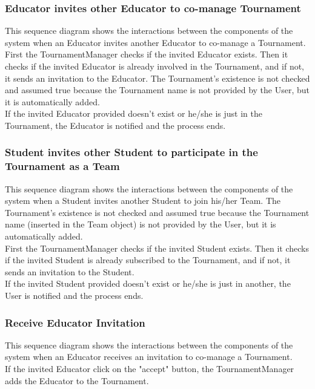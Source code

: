 \begin{landscape}
\clearpage
\subsubsection{Educator invites other Educator to co-manage Tournament}
This sequence diagram shows the interactions between the components of the system when an Educator invites another Educator to co-manage a Tournament.\\
First the TournamentManager checks if the invited Educator exists. Then it checks if the invited Educator is already involved in the Tournament, and if not, it sends an invitation to the Educator. The Tournament's existence is not
checked and assumed true because the Tournament name is not provided by the User, but it is automatically added.\\
If the invited Educator provided doesn't exist or he/she is just in the Tournament, the Educator is notified and the process ends.\\

\clearpage
\subsubsection{Student invites other Student to participate in the Tournament as a Team}
This sequence diagram shows the interactions between the components of the system when a Student invites another Student to join his/her Team. The Tournament's existence is not checked and assumed true because the Tournament name (inserted
in the Team object) is not provided by the User, but it is automatically added.\\
First the TournamentManager checks if the invited Student exists. Then it checks if the invited Student is already subscribed to the Tournament, and if not, it sends an invitation to the Student.\\
If the invited Student provided doesn't exist or he/she is just in another, the User is notified and the process ends.\\

\clearpage
\subsubsection{Receive Educator Invitation}
This sequence diagram shows the interactions between the components of the system when an Educator receives an invitation to co-manage a Tournament.\\
If the invited Educator click on the "accept" button, the TournamentManager adds the Educator to the Tournament.\\


\end{landscape}

